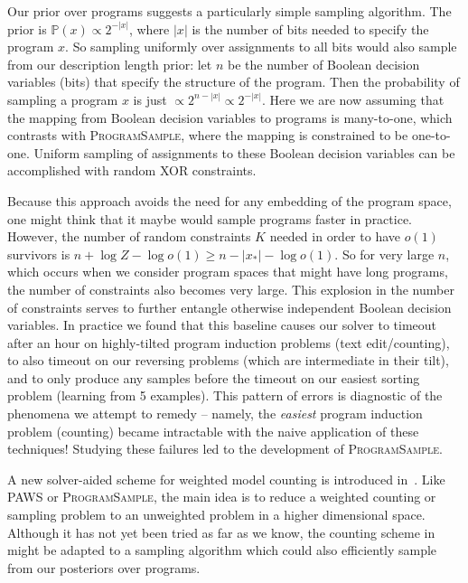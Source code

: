 \documentclass{article}
\newcommand{\theSystem}{\textsc{ProgramSample}}
\newcommand{\Probability}{\mathds{P}} %
\begin{document}
  Our prior over programs suggests a particularly simple sampling algorithm.
  The prior is $\Probability (x)\propto 2^{-|x|}$, where $|x|$ is the number of bits
  needed to specify the program $x$. So sampling uniformly over assignments to all bits
  would also sample from our description length prior: let $n$ be the number of Boolean decision variables (bits) that specify the structure of the program. Then the probability of sampling a program $x$ is just
  $\propto 2^{n-|x|} \propto 2^{-|x|}$.
  Here we are now assuming that the mapping from Boolean decision variables to programs is many-to-one,
  which contrasts with \theSystem, where the mapping is constrained to be one-to-one.
  Uniform sampling of assignments to these Boolean decision variables can be accomplished
  with random XOR constraints.

  Because this approach avoids the need for any embedding of the
  program space, one might think that it maybe would sample programs
  faster in practice.  However, the number of random constraints $K$
  needed in order to have $o(1)$ survivors is $n + \log Z - \log
  o(1)\geq n - |x_*| - \log o(1)$.  So for very large $n$, which
  occurs when we consider program spaces that might have long
  programs, the number of constraints also becomes very large.  This
  explosion in the number of constraints serves to further entangle
  otherwise independent Boolean decision variables.  In practice we
  found that this baseline causes our solver to timeout after an hour
  on highly-tilted program induction problems (text edit/counting), to
  also timeout on our reversing problems (which are intermediate in
  their tilt), and to only produce any samples before the timeout on
  our easiest sorting problem (learning from 5 examples).
  This pattern of errors is diagnostic of the phenomena we attempt to remedy --
  namely, the \emph{easiest} program induction problem (counting) became intractable with the naive application of these techniques! Studying
  these failures led to the development of \theSystem.
    
  A new solver-aided scheme for weighted model counting is introduced
  in~\cite{chakraborty2015weighted}. Like PAWS or \theSystem, the main
  idea is to reduce a weighted counting or sampling problem to an
  unweighted problem in a higher dimensional space. Although it has
  not yet been tried as far as we know, the counting scheme
  in~\cite{chakraborty2015weighted} might be adapted to a sampling
  algorithm which could also efficiently sample from our posteriors
  over programs.
  
\end{document}
